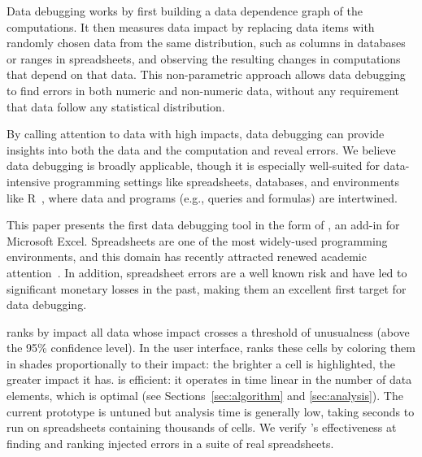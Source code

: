 Data debugging works by first building a data dependence graph of the
computations. It then measures data impact by replacing data items
with randomly chosen data from the same distribution, such as columns
in databases or ranges in spreadsheets, and observing the resulting
changes in computations that depend on that data. This non-parametric
approach allows data debugging to find errors in both numeric and
non-numeric data, without any requirement that data follow any
statistical distribution.

By calling attention to data with high impacts, data
debugging can provide insights into both the data and the computation
and reveal errors. We believe data debugging is broadly applicable, though it is
especially well-suited for data-intensive programming settings
like spreadsheets, databases, and environments like
R~\cite{ihaka1996r}, where data and programs (e.g., queries and
formulas) are intertwined.

This paper presents the first data debugging tool in the form
of \checkcell{}, an add-in for Microsoft Excel. Spreadsheets are one
of the most widely-used programming environments, and this domain has
recently attracted renewed academic
attention~\cite{DBLP:conf/popl/Gulwani11,DBLP:conf/pldi/HarrisG11,Singh:2012:LSS:2212351.2212356}.
In addition, spreadsheet errors are a well known risk and have led to
significant monetary losses in the past, making them an excellent
first target for data debugging.

\checkcell{} ranks by impact all data whose
impact crosses a threshold of unusualness (above the 95\% confidence
level).  In the user interface, \checkcell{} ranks these cells by coloring them in
shades proportionally to their impact: the brighter a cell is
highlighted, the greater impact it has.
\checkcell{} is efficient: it operates in time linear in the number
of data elements, which is optimal (see
Sections~\ref{sec:algorithm} and \ref{sec:analysis}). The current prototype is untuned
but analysis time is generally low, taking seconds to run
on spreadsheets containing thousands of cells. We verify \checkcell{}'s effectiveness
at finding and ranking injected errors in a suite of real spreadsheets.



